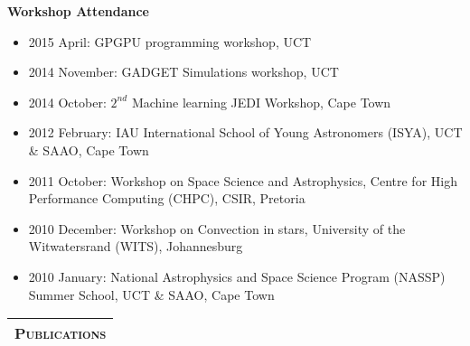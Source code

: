 \documentclass{article}
\renewcommand{\section}[1]{
  \vspace{0.4cm}
  \begin{table}[!htp]					%
    \newcolumntype{C}{>{\centering\arraybackslash}X}	%
    \setlength\extrarowheight{3pt} 			%

    \noindent 						%
    \begin{tabularx}{\textwidth}{C}
    \hline \hline 
      \large \textbf{ \textsc{#1} } \\ 
    \hline \hline
    \end{tabularx}
  \end{table}
}
\begin{document}
\vspace{0.4cm}
% 
\large\textbf{Workshop Attendance}
\vspace{0.2cm}
\normalsize
\begin{itemize}
 \item 2015 April: GPGPU programming workshop, UCT
 \item 2014 November: \textsc{GADGET} Simulations workshop, UCT
 \item 2014 October: $2^{nd}$ Machine learning JEDI Workshop, Cape Town
 \item 2012 February: IAU International School of Young Astronomers (ISYA), UCT \& SAAO, Cape Town
 \item 2011 October: Workshop on Space Science and Astrophysics, Centre for High Performance Computing (CHPC), CSIR, Pretoria 
 \item 2010 December: Workshop on Convection in stars, University of the Witwatersrand (WITS), Johannesburg
 \item 2010 January: National Astrophysics and Space Science Program (NASSP) Summer School, UCT \& SAAO, Cape Town\\
\end{itemize}


\section{Publications}

\begin{refsection}[articles]
  \nocite{*}
  \printbibliography[ title={Peer-reviewed},
		      heading=subbibliography ]
\end{refsection}


\begin{refsection}[proceedings]
  \nocite{*}
  \printbibliography[title={Conference Proceedings},
		     heading=subbibliography]
\end{refsection}


\begin{refsection}[shortpub]
  \nocite{*}
  \printbibliography[title={Short publications},
		     heading=subbibliography]
\end{refsection}


\end{document}
